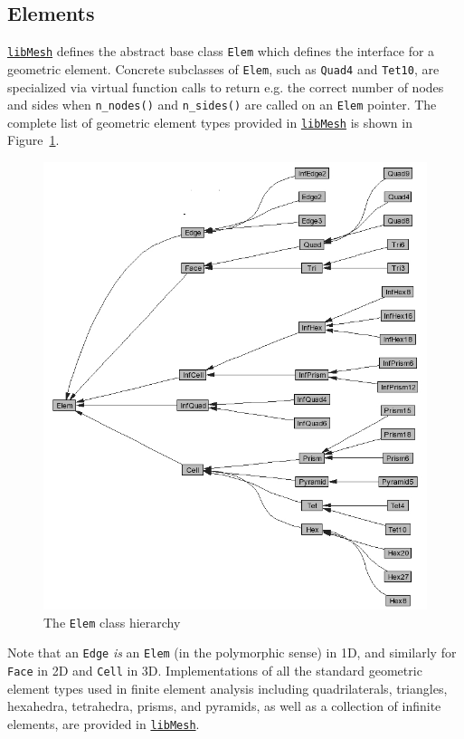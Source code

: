 \documentclass[global,twocolumn,final]{svjour}
\newcommand{\libMesh}{\href{http://libmesh.sourceforge.net}{\texttt{lib\-Mesh}}}
\begin{document}
\subsection{Elements}
\libMesh{} defines the abstract base class \texttt{Elem} which
defines the interface for a geometric element.  Concrete
subclasses of \texttt{Elem}, such as \texttt{Quad4} and
\texttt{Tet10}, are specialized via virtual function calls to return
e.g. the correct number of nodes and sides when \texttt{n\_nodes()} and
\texttt{n\_sides()} are called on an \texttt{Elem} pointer.  The
complete list of geometric element types provided in \libMesh{} is shown in
Figure~\ref{fig:elem_class}.
\begin{figure}
  \begin{center}
    \includegraphics[width=\columnwidth]{figures/inherit_graph}    
    \caption{The \texttt{Elem} class hierarchy\label{fig:elem_class}}
  \end{center}
\end{figure}
Note that an \texttt{Edge} \emph{is} an \texttt{Elem} (in the polymorphic
sense) in 1D, and similarly for \texttt{Face} in 2D and \texttt{Cell} in 3D.
Implementations of all the standard geometric element types used in finite
element analysis including quadrilaterals, triangles, hexahedra, tetrahedra,
prisms, and pyramids, as well as a collection of infinite elements, are
provided in \libMesh.
\end{document}
